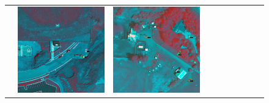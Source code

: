 \begin{figure}[H]
\begin{tabularx}{\textwidth}{c|*{9}{X}}
    & \includegraphics[trim={440pt 360pt 460pt 555pt},clip,width=\linewidth]{images/015Results/02perm_exp/comp_images/gbndvi/427.png}
    & \includegraphics[trim={740pt 420pt 180pt 510pt},clip,width=\linewidth]{images/015Results/02perm_exp/comp_images/gbndvi/523.png}

\end{tabularx}
\end{figure}
